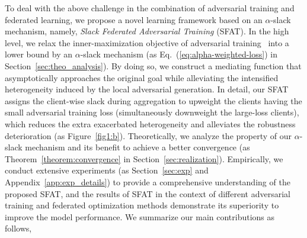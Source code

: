 \documentclass{article} %
\theoremstyle{plain}
\theoremstyle{definition}
\theoremstyle{remark}
\begin{document}
To deal with the above challenge in the combination of adversarial training and federated learning, we propose a novel learning framework based on an $\alpha$-slack mechanism, namely, \textit{Slack Federated Adversarial Training} (SFAT). In the high level, we relax the inner-maximization objective of adversarial training~\citep{Madry_adversarial_training} into a lower bound by an $\alpha$-slack mechanism (as Eq.~(\ref{eq:alpha-weighted-loss}) in Section~\ref{sec:theo_analysis}). By doing so, we construct a mediating function that asymptotically approaches the original goal while alleviating the intensified heterogeneity induced by the local adversarial generation. In detail, our SFAT assigns the client-wise slack during aggregation to upweight the clients having the small adversarial training loss (simultaneously downweight the large-loss clients), which reduces the extra exacerbated heterogeneity and alleviates the robustness deterioration (as Figure~\ref{fig1:b}). Theoretically, we analyze the property of our $\alpha$-slack mechanism and its benefit to achieve a better convergence (as Theorem~\ref{theorem:convergence} in Section~\ref{sec:realization}). Empirically, we conduct extensive experiments (as Section~\ref{sec:exp} and Appendix~\ref{app:exp_details}) to provide a comprehensive understanding of the proposed SFAT, and the results of SFAT in the context of different adversarial training and federated optimization methods demonstrate its superiority to improve the model performance. We summarize our main contributions as follows,
\end{document}
